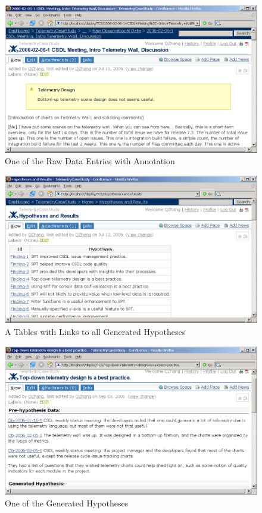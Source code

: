 \begin{figure}[p]
  \center
  \includegraphics[width=1.00\textwidth]{figures/CSDL-RawData2}
  \caption{One of the Raw Data Entries with Annotation} 
  \label{fig:CSDL-RawData2}
\end{figure}	
	

\begin{figure}[p]
  \center
  \includegraphics[width=1.00\textwidth]{figures/CSDL-Hypothesis1}
  \caption{A Tables with Links to all Generated Hypotheses} 
  \label{fig:CSDL-Hypothesis1}
\end{figure}

\begin{figure}[p]
  \center
  \includegraphics[width=1.00\textwidth]{figures/CSDL-Hypothesis2}
  \caption{One of the Generated Hypotheses} 
  \label{fig:CSDL-Hypothesis2}
\end{figure}








